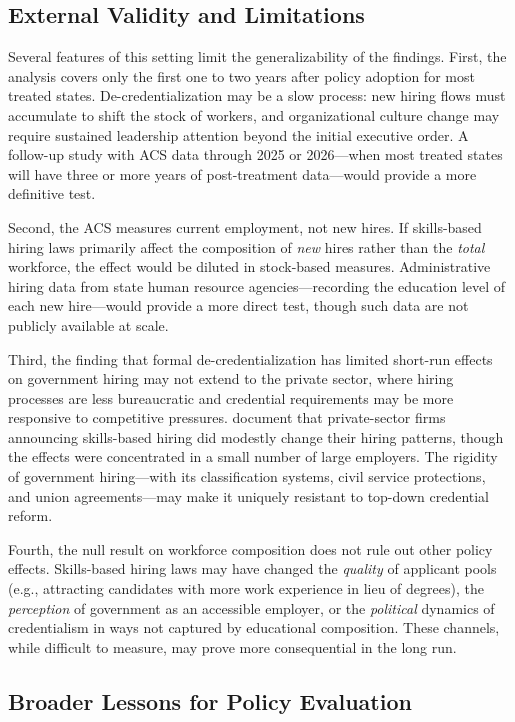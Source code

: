 \documentclass[12pt]{article}
\begin{document}
\subsection{External Validity and Limitations}

Several features of this setting limit the generalizability of the findings. First, the analysis covers only the first one to two years after policy adoption for most treated states. De-credentialization may be a slow process: new hiring flows must accumulate to shift the stock of workers, and organizational culture change may require sustained leadership attention beyond the initial executive order. A follow-up study with ACS data through 2025 or 2026---when most treated states will have three or more years of post-treatment data---would provide a more definitive test.

Second, the ACS measures current employment, not new hires. If skills-based hiring laws primarily affect the composition of \emph{new} hires rather than the \emph{total} workforce, the effect would be diluted in stock-based measures. Administrative hiring data from state human resource agencies---recording the education level of each new hire---would provide a more direct test, though such data are not publicly available at scale.

Third, the finding that formal de-credentialization has limited short-run effects on government hiring may not extend to the private sector, where hiring processes are less bureaucratic and credential requirements may be more responsive to competitive pressures. \citet{FullerSarvestani2022} document that private-sector firms announcing skills-based hiring did modestly change their hiring patterns, though the effects were concentrated in a small number of large employers. The rigidity of government hiring---with its classification systems, civil service protections, and union agreements---may make it uniquely resistant to top-down credential reform.

Fourth, the null result on workforce composition does not rule out other policy effects. Skills-based hiring laws may have changed the \emph{quality} of applicant pools (e.g., attracting candidates with more work experience in lieu of degrees), the \emph{perception} of government as an accessible employer, or the \emph{political} dynamics of credentialism in ways not captured by educational composition. These channels, while difficult to measure, may prove more consequential in the long run.

\subsection{Broader Lessons for Policy Evaluation}
\end{document}
